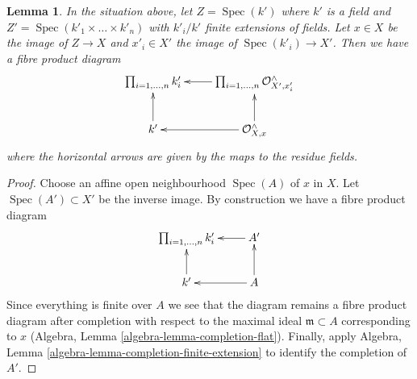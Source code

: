 \documentclass[10pt,a4paper]{amsart}
\theoremstyle{plain}
\newtheorem{lemma}[subsection]{Lemma}
\theoremstyle{definition}
\theoremstyle{remark}
\numberwithin{equation}{subsection}
\def\Spec{\mathop{\mathrm{Spec}}}
\begin{document}
\begin{lemma}
\label{lemma-complete-local-ring-pushout}
In the situation above, let $Z = \Spec(k')$ where $k'$ is a field and
$Z' = \Spec(k'_1 \times \ldots \times k'_n)$ with $k'_i/k'$
finite extensions of fields. Let $x \in X$ be the image of $Z \to X$
and $x'_i \in X'$ the image of $\Spec(k'_i) \to X'$.
Then we have a fibre product diagram
$$
\xymatrix{
\prod\nolimits_{i = 1, \ldots, n} k'_i &
\prod\nolimits_{i = 1, \ldots, n} \mathcal{O}_{X', x'_i}^\wedge \ar[l] \\
k' \ar[u] &
\mathcal{O}_{X, x}^\wedge \ar[u] \ar[l]
}
$$
where the horizontal arrows are given by the maps to the residue fields.
\end{lemma}

\begin{proof}
Choose an affine open neighbourhood $\Spec(A)$ of $x$ in $X$.
Let $\Spec(A') \subset X'$ be the inverse image. By construction
we have a fibre product diagram
$$
\xymatrix{
\prod\nolimits_{i = 1, \ldots, n} k'_i &
A' \ar[l] \\
k' \ar[u] &
A \ar[u] \ar[l]
}
$$
Since everything is finite over $A$ we see that the diagram remains
a fibre product diagram after completion with respect to the
maximal ideal $\mathfrak m \subset A$ corresponding to $x$
(Algebra, Lemma \ref{algebra-lemma-completion-flat}).
Finally, apply Algebra, Lemma
\ref{algebra-lemma-completion-finite-extension}
to identify the completion of $A'$.
\end{proof}
\end{document}
